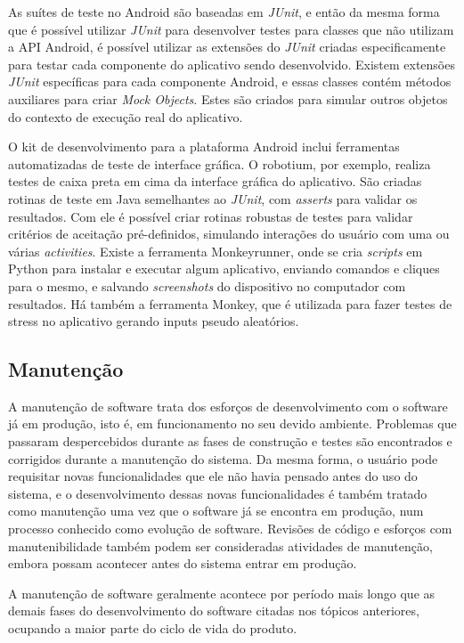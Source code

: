 As suítes de teste no Android são baseadas em \textit{JUnit}, e então da mesma forma que é possível utilizar \textit{JUnit} para desenvolver testes para classes que não utilizam a API Android, é possível utilizar as extensões do \textit{JUnit} criadas especificamente para testar cada componente do aplicativo sendo desenvolvido. Existem extensões \textit{JUnit} específicas para cada componente Android, e essas classes contém métodos auxiliares para criar \textit{Mock Objects}. Estes são criados para simular outros objetos do contexto de execução real do aplicativo.

O kit de desenvolvimento para a plataforma Android inclui ferramentas automatizadas de teste de interface gráfica. O robotium, por exemplo, realiza testes de caixa preta em cima da interface gráfica do aplicativo. São criadas rotinas de teste em Java semelhantes ao \textit{JUnit}, com \textit{asserts} para validar os resultados. Com ele é possível criar rotinas robustas de testes para validar critérios de aceitação pré-definidos, simulando interações do usuário com uma ou várias \textit{activities}. Existe a ferramenta Monkeyrunner, onde se cria \textit{scripts} em Python para instalar e executar algum aplicativo, enviando comandos e cliques para o mesmo, e salvando \textit{screenshots} do dispositivo no computador com resultados. Há também a ferramenta Monkey, que é utilizada para fazer testes de stress no aplicativo gerando inputs pseudo aleatórios.

\subsection{Manutenção}

A manutenção de software trata dos esforços de desenvolvimento com o software já em produção, isto é, em funcionamento no seu devido ambiente. Problemas que passaram despercebidos durante as fases de construção e testes são encontrados e corrigidos durante a manutenção do sistema. Da mesma forma, o usuário pode requisitar novas funcionalidades que ele não havia pensado antes do uso do sistema, e o desenvolvimento dessas novas funcionalidades é também tratado como manutenção uma vez que o software já se encontra em produção, num processo conhecido como evolução de software. Revisões de código e esforços com manutenibilidade também podem ser consideradas atividades de manutenção, embora possam acontecer antes do sistema entrar em produção.

A manutenção de software geralmente acontece por período mais longo que as demais fases do desenvolvimento do software citadas nos tópicos anteriores, ocupando a maior parte do ciclo de vida do produto.


